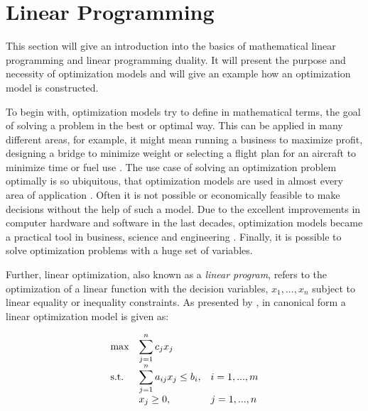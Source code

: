 
\section{Linear Programming}
\label{sec:linear_progamming}
This section will give an introduction into the basics of mathematical linear programming
and linear programming duality.
It will present the purpose and necessity of optimization models and will give
an example how an optimization model is constructed. 

To begin with, optimization models try to define in mathematical terms, the goal
of solving a problem in the best or optimal way. 
This can be applied in many different areas, for example, it might mean running a business to 
maximize profit, designing a bridge to minimize weight or selecting a flight plan for an aircraft
to minimize time or fuel use . 
The use case of solving an optimization problem optimally is so ubiquitous, 
that optimization models are used in almost every area of application .
Often it is not possible or economically feasible to make decisions without the help
of such a model. Due to the excellent improvements in computer hardware and software
in the last decades, optimization models became a practical tool 
in business, science and engineering . 
Finally, it is possible to solve optimization problems with a huge set of variables. 

Further, linear optimization, also known as a \textit{linear program}, refers to the optimization
of a linear function with the decision variables, $x_{1}, ..., x_{n}$ subject to 
linear equality or inequality constraints. 
As presented by , in canonical form 
a linear optimization model is given as:

\begin{equation*}
    \begin{array}{ll@{}ll}
        \text{max}  & \displaystyle\sum\limits_{j=1}^{n} c_{j}x_{j} &\\
        \text{s.t.}& \displaystyle\sum\limits_{j=1}^{n} a_{ij}x_{j} \leq b_{i},  &&i=1 ,..., m\\
                    &                        x_{j} \geq 0, &&j=1 ,..., n
    \end{array}
\end{equation*}

